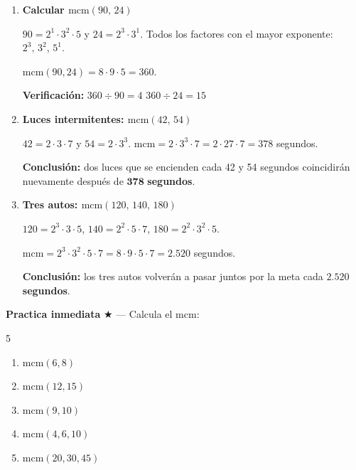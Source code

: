 \documentclass[11pt, letterpaper]{article}
\begin{document}
\begin{tcolorbox}[examplebox, title={Ejemplos --- c\'alculo del mcm}]
\begin{enumerate}[label=\textbf{Ej. \arabic*.}, leftmargin=*, itemsep=12pt]

\item \textbf{Calcular $\text{mcm}(90,\,24)$}

$90=2^1\cdot 3^2\cdot 5$ y $24=2^3\cdot 3^1$. Todos los factores con el mayor exponente: $2^3,\,3^2,\,5^1$.

$\text{mcm}(90,24)=8\cdot 9\cdot 5=360$.

\textbf{Verificaci\'on:} $360\div 90=4$ \checkmark \quad $360\div 24=15$ \checkmark

\item \textbf{Luces intermitentes: $\text{mcm}(42,\,54)$}

$42=2\cdot 3\cdot 7$ y $54=2\cdot 3^3$. $\text{mcm}=2\cdot 3^3\cdot 7=2\cdot 27\cdot 7=378$ segundos.

\textbf{Conclusi\'on:} dos luces que se encienden cada 42 y 54 segundos coincidir\'an nuevamente despu\'es de $\mathbf{378}$ \textbf{segundos}.

\item \textbf{Tres autos: $\text{mcm}(120,\,140,\,180)$}

$120=2^3\cdot 3\cdot 5$, $140=2^2\cdot 5\cdot 7$, $180=2^2\cdot 3^2\cdot 5$.

$\text{mcm}=2^3\cdot 3^2\cdot 5\cdot 7=8\cdot 9\cdot 5\cdot 7=2.520$ segundos.

\textbf{Conclusi\'on:} los tres autos volver\'an a pasar juntos por la meta cada $\mathbf{2.520}$ \textbf{segundos}.

\end{enumerate}
\end{tcolorbox}

\medskip
\textbf{Practica inmediata} \quad $\bigstar$ --- Calcula el mcm:
\begin{multicols}{5}
\begin{enumerate}[label=\alph*), leftmargin=*]
  \item $\text{mcm}(6,8)$
  \item $\text{mcm}(12,15)$
  \item $\text{mcm}(9,10)$
  \item $\text{mcm}(4,6,10)$
  \item $\text{mcm}(20,30,45)$
\end{enumerate}
\end{multicols}
\end{document}
